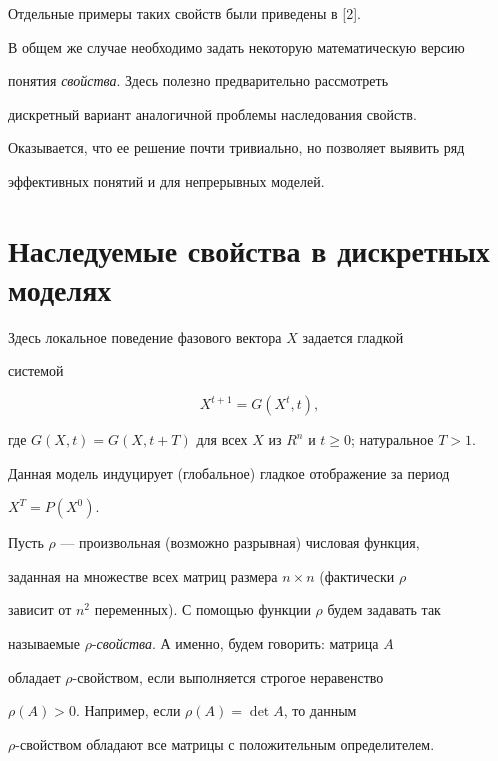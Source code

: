  


Отдельные примеры таких свойств были приведены в [2]. 


В общем же случае необходимо задать некоторую математическую версию 


понятия {\it свойства}. Здесь полезно предварительно рассмотреть 


дискретный вариант аналогичной проблемы наследования свойств. 


Оказывается, что ее решение почти тривиально, но позволяет выявить ряд 


эффективных понятий и для непрерывных моделей. 


 


\section{Наследуемые свойства в дискретных моделях} 


 


Здесь локальное поведение фазового вектора $X$ задается гладкой 


системой 


\begin{equation} 


X^{t+1}=G(X^t,t), 


\end{equation} 


где $G(X,t)=G(X,t+T)$ для всех $X$ из $R^n$ и $t\ge0$; натуральное $T>1$. 


Данная модель индуцирует (глобальное) гладкое отображение за период 


$X^T=P(X^0)$. 


 


Пусть $\rho$ --- произвольная (возможно разрывная) числовая функция, 


заданная на множестве всех матриц размера $n\times n$ (фактически $\rho$ 


зависит от $n^2$ переменных). С помощью функции $\rho$ будем задавать так 


называемые $\rho$-{\it свойства}. А именно, будем говорить: матрица $A$ 


обладает $\rho$-свойством, если выполняется строгое неравенство 


$\rho(A)>0$. Например, если $\rho(A)=\det A$, то данным 


$\rho$-свойством обладают все матрицы с положительным определителем. 


